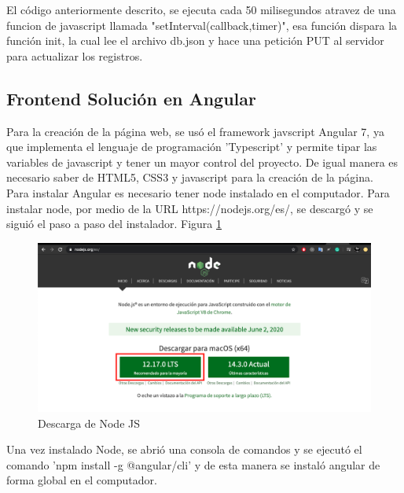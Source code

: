         El código anteriormente descrito, se ejecuta cada 50 milisegundos atravez de una funcion de javascript llamada "setInterval(callback,timer)", esa función dispara la función init, la cual lee el archivo db.json y hace una petición PUT al servidor para actualizar los registros.

    \subsection{Frontend Solución en Angular}
        
        Para la creación de la página web, se usó el framework javscript Angular 7, ya que implementa el lenguaje de programación 'Typescript' y permite tipar las variables de javascript y tener un mayor control del proyecto. De igual manera es necesario saber de HTML5, CSS3 y javascript para la creación de la página.\\
        Para instalar Angular es necesario tener node instalado en el computador. Para instalar node, por medio de la URL https://nodejs.org/es/, se descargó y se siguió el paso a paso del instalador. Figura \ref{fig:node} \\

        \begin{figure}[H]
            \begin{center}
                \includegraphics[width = 15cm]{3Proyecto/node}
                \caption{ Descarga de Node JS } 
                \label{fig:node}
           \end{center}
        \end{figure}

        Una vez instalado Node, se abrió una consola de comandos y se ejecutó el comando 'npm install -g @angular/cli' y de esta manera se instaló angular de forma global en el computador.\\

